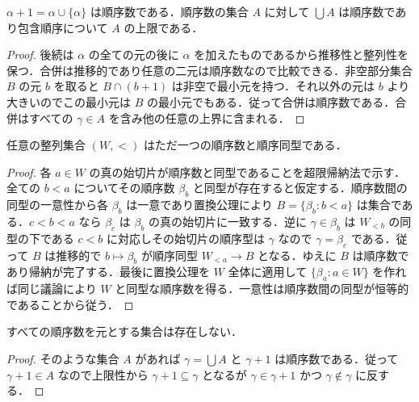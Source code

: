 \begin{prop}[後続順序数と上限]
$\alpha+1=\alpha\cup\{\alpha\}$ は順序数である．順序数の集合 $A$ に対して $\bigcup A$ は順序数であり包含順序について $A$ の上限である．
\end{prop}
\begin{proof}
後続は $\alpha$ の全ての元の後に $\alpha$ を加えたものであるから推移性と整列性を保つ．合併は推移的であり任意の二元は順序数なので比較できる．非空部分集合 $B$ の元 $b$ を取ると $B\cap(b+1)$ は非空で最小元を持つ．それ以外の元は $b$ より大きいのでこの最小元は $B$ の最小元でもある．従って合併は順序数である．合併はすべての $\gamma\in A$ を含み他の任意の上界に含まれる．
\end{proof}
\begin{prop}[整列集合の順序型]
任意の整列集合 $(W,<)$ はただ一つの順序数と順序同型である．
\end{prop}
\begin{proof}
各 $a\in W$ の真の始切片が順序数と同型であることを超限帰納法で示す．全ての $b<a$ についてその順序数 $\beta_b$ と同型が存在すると仮定する．順序数間の同型の一意性から各 $\beta_b$ は一意であり置換公理により $B=\{\beta_b:b<a\}$ は集合である．$c<b<a$ なら $\beta_c$ は $\beta_b$ の真の始切片に一致する．逆に $\gamma\in\beta_b$ は $W_{<b}$ の同型の下である $c<b$ に対応しその始切片の順序型は $\gamma$ なので $\gamma=\beta_c$ である．従って $B$ は推移的で $b\mapsto\beta_b$ が順序同型 $W_{<a}\to B$ となる．ゆえに $B$ は順序数であり帰納が完了する．最後に置換公理を $W$ 全体に適用して $\{\beta_a:a\in W\}$ を作れば同じ議論により $W$ と同型な順序数を得る．一意性は順序数間の同型が恒等的であることから従う．
\end{proof}
\begin{prop}[全順序数からなる集合の不存在]
すべての順序数を元とする集合は存在しない．
\end{prop}
\begin{proof}
そのような集合 $A$ があれば $\gamma=\bigcup A$ と $\gamma+1$ は順序数である．従って $\gamma+1\in A$ なので上限性から $\gamma+1\subseteq\gamma$ となるが $\gamma\in\gamma+1$ かつ $\gamma\notin\gamma$ に反する．
\end{proof}
